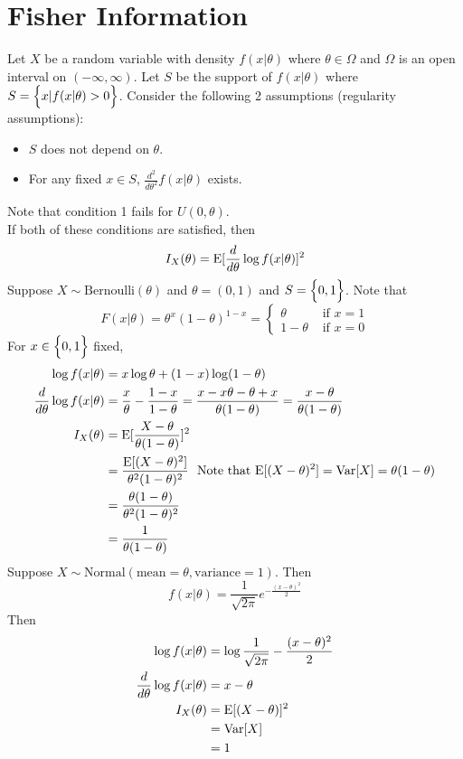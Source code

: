 \documentclass[12pt]{article}
\begin{document}
\section{Fisher Information} 
Let $X$ be a random variable with density $f(x|\theta)$ where $\theta \in \Omega$ and $\Omega$ is an open interval on $(-\infty, \infty)$. Let $S$ be the support of $f(x|\theta)$ where $ S = \Big\{ x | f(x|\theta) > 0 \Big\}$. Consider the following 2 assumptions (regularity assumptions): \begin{itemize} 
\item $S$ does not depend on $\theta$. 
\item For any fixed $x \in S$, $\frac{d^2}{d\theta^2} f(x|\theta)$ exists. \end{itemize} 
Note that condition 1 fails for $U(0,\theta)$. \\
If both of these conditions are satisfied, then $$ I_X(\theta) = \mathrm{E}[ \frac{d}{d\theta} \log f(x|\theta) ]^2 $$ 
Suppose $X \sim \text{Bernoulli}(\theta)$ and $\theta = (0,1)$ and $S = \Big\{ 0,1 \Big\}$. Note that $$F(x|\theta) = \theta^x(1 - \theta)^{1-x} = \begin{cases} \theta &\text{ if } x = 1 \\ 1 - \theta &\text{ if } x = 0 \end{cases} $$ 
For $x \in \Big\{ 0,1 \Big\}$ fixed, $$ \begin{aligned} \log f(x | \theta) &= x \log \theta + (1-x)\log(1-\theta) \\ \frac{d}{d\theta} \log f(x|\theta) &= \frac{x}{\theta} - \frac{1-x}{1-\theta} = \frac{x-x\theta - \theta + x}{\theta(1 - \theta)} = \frac{x-\theta}{\theta(1-\theta)} \\ I_X(\theta) &= \mathrm{E}[  \frac{X - \theta}{\theta(1 - \theta)} ]^2 \\ &= \frac{\mathrm{E}[ (X - \theta)^2 ]}{\theta^2(1-\theta)^2} ~~ \text{Note that } \mathrm{E}[ (X - \theta)^2 ] = \mathrm{Var}[ X ] = \theta(1 - \theta) \\ &= \frac{\theta(1-\theta)}{\theta^2(1 - \theta)^2} \\ &= \frac{1}{\theta(1-\theta)} \end{aligned} $$ 
Suppose $X \sim \text{Normal}(\text{mean} = \theta, \text{variance} = 1)$. Then $$f(x|\theta) = \frac{1}{\sqrt{2\pi}} e^{-\frac{(x-\theta)^2}{2}} $$ Then $$ \begin{aligned} \log f(x | \theta) &= \log \frac{1}{\sqrt{2\pi}} - \frac{(x-\theta)^2}{2} \\ \frac{d}{d\theta} \log f(x|\theta) &= x - \theta \\ I_X(\theta) &= \mathrm{E}[ (X - \theta) ]^2 \\ &= \mathrm{Var}[ X ] \\ &= 1 \end{aligned}$$ 
\end{document}

